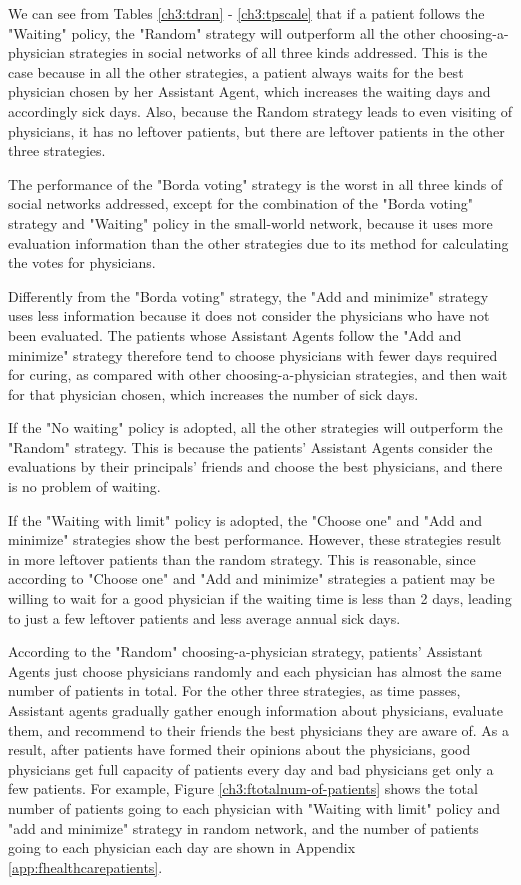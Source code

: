 We can see from Tables \ref{ch3:tdran} - \ref{ch3:tpscale} that if a patient follows the "Waiting" policy, the "Random" strategy will outperform all the other choosing-a-physician strategies in social networks of all three kinds addressed. This is the case because in all the other strategies, a patient always waits for the best physician chosen by her Assistant Agent, which increases the waiting days and accordingly sick days. Also, because the Random strategy leads to even visiting of physicians, it has no leftover patients, but there are leftover patients in the other three strategies.  

The performance of the "Borda voting" strategy is the worst in all three kinds of social networks addressed, except for the combination of the "Borda voting" strategy and "Waiting" policy in the small-world network, because it uses more evaluation information than the other strategies due to its method for calculating the votes for physicians. 

Differently from the "Borda voting" strategy, the "Add and minimize" strategy uses less information because it does not consider the physicians who have not been evaluated. The patients whose Assistant Agents follow the "Add and minimize" strategy therefore tend to choose physicians with fewer days required for curing, as compared with other choosing-a-physician strategies, and then wait for that physician chosen, which increases the number of sick days.

If the "No waiting" policy is adopted, all the other strategies will outperform the "Random" strategy. This is because the patients' Assistant Agents consider the evaluations by their principals' friends and choose the best physicians, and there is no problem of waiting.

If the "Waiting with limit" policy is adopted, the "Choose one" and "Add and minimize" strategies show the best performance. However, these strategies result in more leftover patients than the random strategy. This is reasonable, since according to "Choose one" and "Add and minimize" strategies a patient may be willing to wait for a good physician if the waiting time is less than 2 days, leading to just a few leftover patients and less average annual sick days.

According to the "Random" choosing-a-physician strategy, patients' Assistant Agents just choose physicians randomly and each physician has almost the same number of patients in total. For the other three strategies, as time passes, Assistant agents gradually gather enough information about physicians, evaluate them, and recommend to their friends the best physicians they are aware of. As a result, after patients have formed their opinions about the physicians, good physicians get full capacity of patients every day and bad physicians get only a few patients. For example, Figure \ref{ch3:ftotalnum-of-patients} shows the total number of patients going to each physician with "Waiting with limit" policy and "add and minimize" strategy in random network, and the number of patients going to each physician each day are shown in Appendix \ref{app:fhealthcarepatients}.

